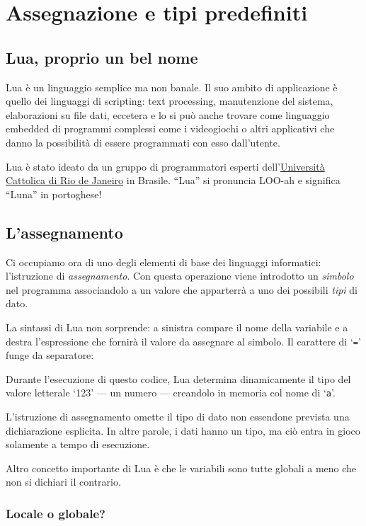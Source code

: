 
\chapter{Assegnazione e tipi predefiniti}
\label{chAssignment}


\section{Lua, proprio un bel nome}

Lua è un linguaggio semplice ma non banale. Il suo ambito di applicazione è
quello dei linguaggi di scripting: text processing, manutenzione del sistema,
elaborazioni su file dati, eccetera e lo si può anche trovare come linguaggio
embedded di programmi complessi come i videogiochi o altri applicativi
che danno la possibilità di essere programmati con esso dall'utente.

Lua è stato ideato da un gruppo di programmatori esperti
dell'\href{http://www.puc-rio.br/index.html}{Università Cattolica di Rio de
Janeiro} in Brasile. ``Lua'' si pronuncia LOO-ah e significa ``Luna'' in
portoghese!


\section{L'assegnamento}

Ci occupiamo ora di uno degli elementi di base dei linguaggi informatici:
l'istruzione di \emph{assegnamento}. Con questa operazione viene introdotto un
\emph{simbolo} nel programma associandolo a un valore che apparterrà a uno
dei possibili \emph{tipi} di dato.

La sintassi di Lua non sorprende: a sinistra compare il nome della variabile e
a destra l'espressione che fornirà il valore da assegnare al simbolo. Il
carattere di `\texttt{=}' funge da separatore:

Durante l'esecuzione di questo codice, Lua determina dinamicamente il tipo del
valore letterale `123' --- un numero --- creandolo in memoria col nome di
`\texttt{a}'.

L'istruzione di assegnamento omette il tipo di dato non essendone prevista una
dichiarazione esplicita. In altre parole, i dati hanno un tipo, ma ciò entra in
gioco solamente a tempo di esecuzione.

Altro concetto importante di Lua è che le variabili sono tutte globali a meno
che non si dichiari il contrario.


\subsection{Locale o globale?}
\label{secFondLocaleGlobale}

